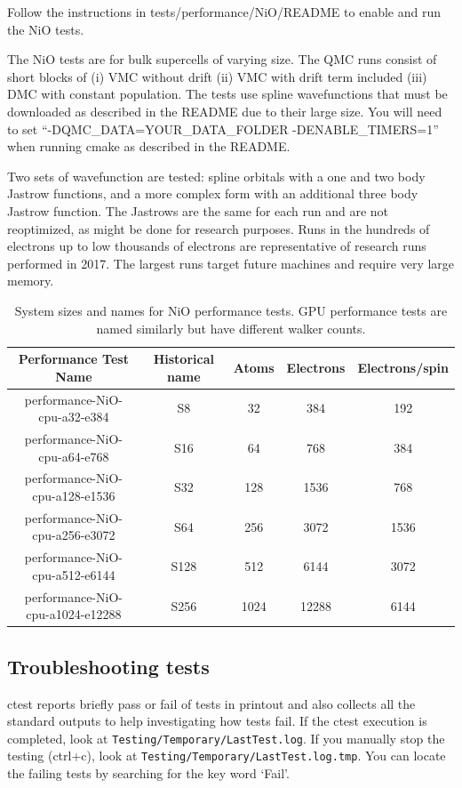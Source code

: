 Follow the instructions in tests/performance/NiO/README to
enable and run the NiO tests.

The NiO tests are for bulk supercells of varying size. The QMC runs consist of short blocks of (i) VMC
without drift (ii) VMC with drift term included (iii) DMC with
constant population. The tests use spline wavefunctions that must be
downloaded as described in the README due to their large size. You
will need to set ``-DQMC\_DATA=YOUR\_DATA\_FOLDER -DENABLE\_TIMERS=1''
when running cmake as
described in the README.

Two sets of wavefunction are tested: spline orbitals with a one and
two body Jastrow functions, and a more complex form with an additional
three body Jastrow function. The Jastrows are the same for each run
and are not reoptimized, as might be done for research purposes.  Runs
in the hundreds of electrons up to low thousands of electrons are representative of
research runs performed in 2017. The largest runs target
future machines and require very large memory.

\begin{table}[h]
\begin{center}
\begin{tabular}{|c|c|c|c|c|}
\hline
\bfseries Performance Test Name&  \bfseries Historical name &\bfseries Atoms& \bfseries Electrons&  \bfseries Electrons/spin \\
\hline
performance-NiO-cpu-a32-e384  & S8 & 32 & 384 & 192 \\
performance-NiO-cpu-a64-e768  & S16 & 64 & 768 & 384 \\
performance-NiO-cpu-a128-e1536 & S32 & 128 & 1536 & 768 \\
performance-NiO-cpu-a256-e3072 & S64 & 256 & 3072 & 1536 \\
performance-NiO-cpu-a512-e6144 & S128 & 512 & 6144 & 3072 \\
performance-NiO-cpu-a1024-e12288& S256 & 1024 & 12288 & 6144 \\
\hline
\end{tabular}
  \caption{System sizes and names for NiO performance tests. GPU performance
    tests are named similarly but have different walker counts.}
  \label{tab:niotests}
\end{center}
\end{table}

\subsection{Troubleshooting tests}
ctest reports briefly pass or fail of tests in printout and also collects all the standard outputs to help investigating how tests fail.
If the ctest execution is completed, look at \texttt{Testing/Temporary/LastTest.log}.
If you manually stop the testing (ctrl+c), look at \texttt{Testing/Temporary/LastTest.log.tmp}.
You can locate the failing tests by searching for the key word `Fail'.

